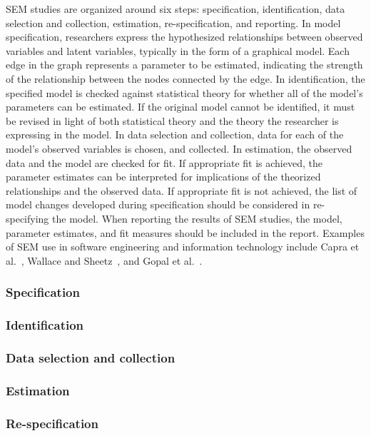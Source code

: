 SEM studies are organized around six steps: specification, identification, data selection and collection, estimation, re-specification, and reporting. In model specification, researchers express the hypothesized relationships between observed variables and latent variables, typically in the form of a graphical model. Each edge in the graph represents a parameter to be estimated, indicating the strength of the relationship between the nodes connected by the edge. In identification, the specified model is checked against statistical theory for whether all of the model’s parameters can be estimated. If the original model cannot be identified, it must be revised in light of both statistical theory and the theory the researcher is expressing in the model. In data selection and collection, data for each of the model’s observed variables is chosen, and collected. In estimation, the observed data and the model are checked for fit.  If appropriate fit is achieved, the parameter estimates can be interpreted for implications of the theorized relationships and the observed data. If appropriate fit is not achieved, the list of model changes developed during specification should be considered in re-specifying the model.  When reporting the results of SEM studies, the model, parameter estimates, and fit measures should be included in the report.
Examples of SEM use in software engineering and information technology include Capra et al.~\cite{capra2008empirical}, Wallace and Sheetz~\cite{wallace2014adoption}, and Gopal et al.~\cite{gopal2005impact}.

\subsubsection{Specification}

\subsubsection{Identification}
\subsubsection{Data selection and collection}
\subsubsection{Estimation}
\subsubsection{Re-specification}
